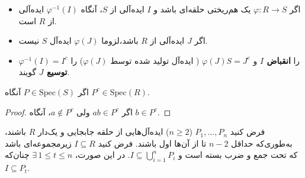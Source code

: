 \begin{remark}

    \begin{itemize}
        \item اگر $\varphi: R \to S$ یک هم‌ریختی حلقه‌ای باشد و $I$ ایده‌آلی از $S$، آنگاه $\varphi^{-1}(I)$ ایده‌آلی از $R$ است.
        \item اگر $J$ ایده‌آلی از $R$ باشد،لزوما \(\varphi(J)\) ایده‌آل  \(S\) نیست.
        \item $\varphi^{-1}(I) = I^c$ را \textbf{انقباض   $I$} و $\varphi(J)S = J^e$ ({ ایده‌آل تولید شده توسط \(\varphi(J)\)}) را \textbf{ توسیع   $J$} گویند.
    \end{itemize}

\end{remark}



\begin{theorem}
    اگر $P \in \mathrm{Spec}(S)$ آنگاه $P^c \in \mathrm{Spec}(R)$.
\end{theorem}

\begin{proof}
    اگر $ab \in P^c$ ولی $a \notin P^c$، آنگاه $b \in P^c$.
\end{proof}


\begin{theorem}
    فرض کنید $P_1, \dots, P_n$ (\(n \geq 2\)) ایده‌آل‌هایی از حلقه جابجایی و یک‌دار $R$ باشند، به‌طوری‌که حداقل $n-2$ تا از آن‌ها اول باشند. فرض کنید $I \subseteq R$ زیرمجموعه‌ای باشد که تحت جمع و ضرب بسته است و $I \subseteq \bigcup_{i=1}^n P_i$. در این صورت، $\exists\, 1 \le t \le n$ چنان‌که $I \subseteq P_t$.

\end{theorem}


